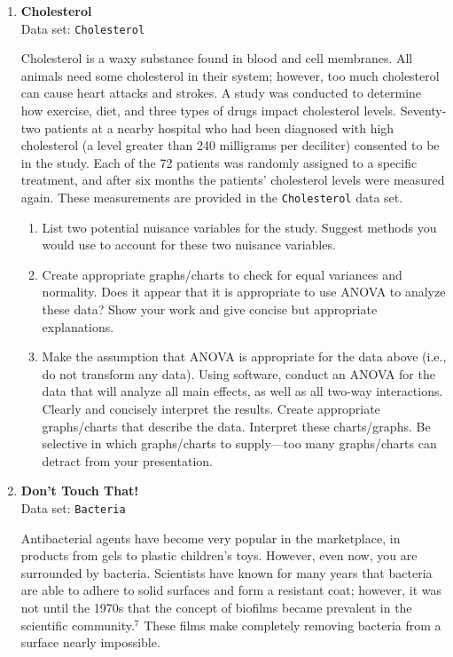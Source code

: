 \documentclass[
]{report}
\begin{document}
\begin{enumerate}
  \item \textbf{Cholesterol}\\
  Data set: \texttt{Cholesterol}

Cholesterol is a waxy substance found in blood and cell membranes. All animals need some cholesterol in their system; however, too much cholesterol can cause heart attacks and strokes. A study was conducted to determine how exercise, diet, and three types of drugs impact cholesterol levels. Seventy-two patients at a nearby hospital who had been diagnosed with high cholesterol (a level greater than 240 milligrams per deciliter) consented to be in the study. Each of the 72 patients was randomly assigned to a specific treatment, and after six months the patients’ cholesterol levels were measured again. These measurements are provided in the \texttt{Cholesterol} data set.

  \begin{enumerate}
    \item List two potential nuisance variables for the study. Suggest methods you would use to account for these two nuisance variables.
    \item Create appropriate graphs/charts to check for equal variances and normality. Does it appear that it is appropriate to use ANOVA to analyze these data? Show your work and give concise but appropriate explanations.
    \item Make the assumption that ANOVA is appropriate for the data above (i.e., do not transform any data). Using software, conduct an ANOVA for the data that will analyze all main effects, as well as all two-way interactions. Clearly and concisely interpret the results. Create appropriate graphs/charts that describe the data. Interpret these charts/graphs. Be selective in which graphs/charts to supply---too many graphs/charts can detract from your presentation.
  \end{enumerate}

  \item \textbf{Don't Touch That!}\\
  Data set: \texttt{Bacteria}

Antibacterial agents have become very popular in the marketplace, in products from gels to plastic children’s toys. However, even now, you are surrounded by bacteria. Scientists have known for many years that bacteria are able to adhere to solid surfaces and form a resistant coat; however, it was not until the 1970s that the concept of biofilms became prevalent in the scientific community.$^7$ These films make completely removing bacteria from a surface nearly impossible.


\end{enumerate}
\end{document}
